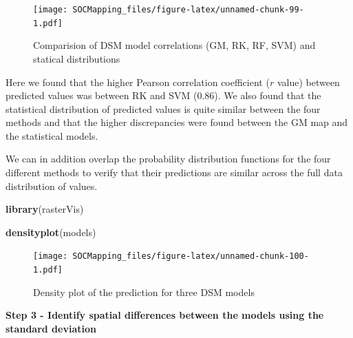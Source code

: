\documentclass[10pt,b5paper,]{book}
\newenvironment{Shaded}{\begin{snugshade}}{\end{snugshade}}
\newcommand{\CommentTok}[1]{\textcolor[rgb]{0.56,0.35,0.01}{\textit{#1}}}
\newcommand{\DataTypeTok}[1]{\textcolor[rgb]{0.13,0.29,0.53}{#1}}
\newcommand{\KeywordTok}[1]{\textcolor[rgb]{0.13,0.29,0.53}{\textbf{#1}}}
\newcommand{\NormalTok}[1]{#1}
\newcommand{\OtherTok}[1]{\textcolor[rgb]{0.56,0.35,0.01}{#1}}
\newcommand{\StringTok}[1]{\textcolor[rgb]{0.31,0.60,0.02}{#1}}
\theoremstyle{definition}
\theoremstyle{definition}
\theoremstyle{definition}
\theoremstyle{remark}
\begin{document}
\begin{Shaded}
\end{Shaded}

\begin{figure}
\centering
\texttt{[image: SOCMapping\_files/figure-latex/unnamed-chunk-99-1.pdf]}
\caption{\label{fig:unnamed-chunk-99}Comparision of DSM model correlations
(GM, RK, RF, SVM) and statical distributions}
\end{figure}

Here we found that the higher Pearson correlation coefficient (\(r\)
value) between predicted values was between RK and SVM (0.86). We also
found that the statistical distribution of predicted values is quite
similar between the four methods and that the higher discrepancies were
found between the GM map and the statistical models.

We can in addition overlap the probability distribution functions for
the four different methods to verify that their predictions are similar
across the full data distribution of values.

\begin{Shaded}
\begin{Highlighting}[]
\KeywordTok{library}\NormalTok{(rasterVis)}

\KeywordTok{densityplot}\NormalTok{(models)}
\end{Highlighting}
\end{Shaded}

\begin{figure}
\centering
\texttt{[image: SOCMapping\_files/figure-latex/unnamed-chunk-100-1.pdf]}
\caption{\label{fig:unnamed-chunk-100}Density plot of the prediction for
three DSM models}
\end{figure}

\textbf{Step 3 - Identify spatial differences between the models using
the standard deviation}
\end{document}
